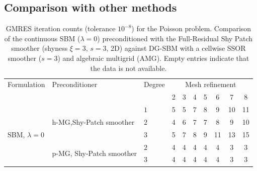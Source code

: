 \documentclass{elsarticle}
\begin{document}
\subsection{Comparison with other methods}

\begin{table}[h!]
    \centering
    \caption{GMRES iteration counts (tolerance $10^{-8}$) for the Poisson problem. Comparison of the continuous SBM ($\lambda=0$) preconditioned with the Full-Residual Shy Patch smoother (shyness $\xi=3$, $s=3$, 2D) against DG-SBM with a cellwise SSOR smoother ($s=3$) and algebraic multigrid (AMG). Empty entries indicate that the data is not available.}
    \label{tab:comparison_cutfem}
    \begin{tabular}{lll|ccccccc}
        \hline
        Formulation                             & Preconditioner                                               & Degree & \multicolumn{7}{c}{Mesh refinement}                              \\
                                                &                                                              &        & 2                                   & 3 & 4  & 5  & 6  & 7  & 8  \\
        \hline
        \multirow{7}{*}{SBM, $\lambda=0$}       & \multirow{3}{*}{h-MG,Shy-Patch smoother}                     & $1$    & 5                                   & 5 & 7  & 8  & 9  & 10 & 11 \\
                                                &                                                              & $2$    & 4                                   & 6 & 7  & 7  & 8  & 9  & 10 \\
                                                &                                                              & $3$    & 5                                   & 7 & 8  & 9  & 11 & 13 & 15 \\
        \cline{2-10}
                                                & \multirow{3}{*}{p-MG, Shy-Patch smoother}                    & $2$    & 4                                   & 4 & 4  & 4  & 4  & 3  & 3  \\
                                                &                                                              & $3$    & 4                                   & 4 & 4  & 4  & 4  & 3  & 3  \\

\end{tabular}
\end{table}
\end{document}
